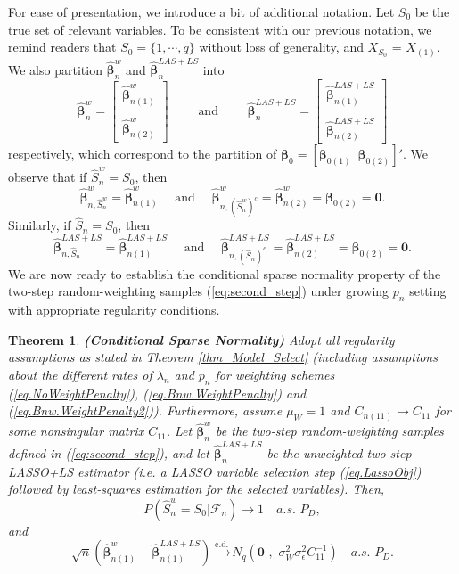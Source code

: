 \documentclass[ejs,authoryear,linksfromyear]{imsart}
\newcommand{\CONV}[1]{\stackrel{\text{#1}}{\longrightarrow}} %
\newcommand{\bnw}{\widehat{\bm{\beta}}_n^w} %
\newcommand{\bnwa}{\widehat{\bm{\beta}}_{n(1)}^w}
\numberwithin{equation}{section}
\theoremstyle{plain}
\newtheorem{thm}{Theorem}[section]
\begin{document}
For ease of presentation, we  introduce a bit of additional notation. Let $S_0$ be the true set of relevant variables. To be consistent with our previous notation, we remind readers that $S_0 = \{1, \cdots, q\}$ without loss of generality, and $X_{S_0}$ = $X_{(1)}$. We  also partition $\bnw$ and $\widehat{\bm{\beta}}_n^{LAS+LS}$ into  
$$
\bnw = 
\begin{bmatrix}
\bnwa \\
\\
\widehat{\bm{\beta}}^w_{n(2)}
\end{bmatrix}
\quad \quad \text{ and } \quad \quad
\widehat{\bm{\beta}}_n^{LAS+LS} =
\begin{bmatrix}
\widehat{\bm{\beta}}^{LAS+LS}_{n(1)} \\
\\
\widehat{\bm{\beta}}^{LAS+LS}_{n(2)}
\end{bmatrix}
$$
respectively, which correspond to the partition of $\bm{\beta}_0 = \left[ \bm{\beta}_{0(1)} \,\,\, \bm{\beta}_{0(2)} \right]'$. We observe that if $\widehat{S}^w_n = S_0$, then 
$$
\widehat{\bm{\beta}}^w_{n, \widehat{S}_n^w} = \bnwa
\quad \text{ and } \quad 
\widehat{\bm{\beta}}^w_{n, (\widehat{S}_n^w)^c}  = \widehat{\bm{\beta}}^w_{n (2)} 
= \bm{\beta}_{0(2)} = \bm{0}.
$$
Similarly, if $\widehat{S}_n = S_0$, then 
$$
\widehat{\bm{\beta}}_{n, \widehat{S}_n}^{LAS+LS}  = \widehat{\bm{\beta}}_{n (1)}^{LAS+LS} 
\quad \text{ and } \quad 
\widehat{\bm{\beta}}_{n, (\widehat{S}_n)^c}^{LAS+LS}   = \widehat{\bm{\beta}}_{n (2)}^{LAS+LS} 
= \bm{\beta}_{0(2)} = \bm{0}.
$$ 
We are now ready to establish the conditional sparse normality property of the two-step random-weighting samples (\ref{eq:second_step}) under growing $p_n$ setting with appropriate regularity conditions.

\begin{thm} \label{thm_cond_oracle}
	\textbf{(Conditional Sparse Normality)} Adopt all regularity assumptions as stated in Theorem \ref{thm_Model_Select} (including assumptions about the different rates of $\lambda_n$ and $p_n$ for weighting schemes (\ref{eq.NoWeightPenalty}), (\ref{eq.Bnw.WeightPenalty}) and (\ref{eq.Bnw.WeightPenalty2})). Furthermore, assume $\mu_W = 1$ and $C_{n(11)} \to C_{11}$ for some nonsingular matrix $C_{11}$. Let $\bnw$ be the two-step random-weighting samples defined in (\ref{eq:second_step}), and let $\widehat{\bm{\beta}}_n^{LAS+LS}$ be the unweighted two-step LASSO+LS estimator (i.e. a LASSO variable selection step (\ref{eq.LassoObj}) followed by least-squares estimation for the selected variables). Then,
	$$
	P\left(
		\widehat{S}^w_n = S_0
		\big| \mathcal{F}_n 
	\right)	
	\to 1
	\quad a.s. \,\, P_D,
	$$
	and
	$$
	\sqrt{n} \left( 
	\widehat{\bm{\beta}}_{n(1)}^w - \widehat{\bm{\beta}}^{LAS+LS}_{n(1)}
	\right) 
	\CONV{c.d.} 
	N_q \left( 
	\bm{0} \,\, , \,\, 
	\sigma^2_W \sigma^2_{\epsilon} C_{11}^{-1} 
	\right)
	\quad a.s. \,\, P_D.
	$$
\end{thm}
\end{document}
